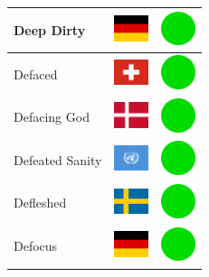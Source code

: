\documentclass[12pt, a4paper, twoside]{report}
\begin{document}
\begin{center}
\begin{longtable}{|p{5cm}|p{2cm}|p{2cm}|}
 Deep Dirty                                                 & \includegraphics[width=1cm]{../img/flags/de} &   \includegraphics[width=1cm]{../likes/y} \\ \hline
 Defaced                                                    & \includegraphics[width=1cm]{../img/flags/ch} &   \includegraphics[width=1cm]{../likes/y} \\ \hline
 Defacing God                                               & \includegraphics[width=1cm]{../img/flags/dk} &   \includegraphics[width=1cm]{../likes/y} \\ \hline
 Defeated Sanity                                            & \includegraphics[width=1cm]{../img/flags/un} &   \includegraphics[width=1cm]{../likes/y} \\ \hline
 Defleshed                                                  & \includegraphics[width=1cm]{../img/flags/se} &   \includegraphics[width=1cm]{../likes/y} \\ \hline
 Defocus                                                    & \includegraphics[width=1cm]{../img/flags/de} &   \includegraphics[width=1cm]{../likes/y} \\ \hline

\end{longtable}
\end{center}
\end{document}
